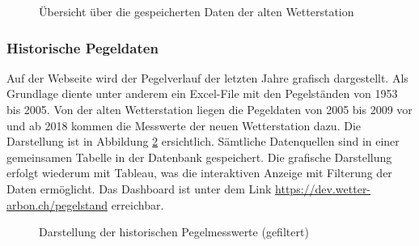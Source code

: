 \begin{figure}[h!]
	\centering
	\caption{Übersicht über die gespeicherten Daten der alten Wetterstation}
	\label{img:histAlt}
\end{figure}



\subsubsection{Historische Pegeldaten}
\label{subsec:pegelhistory}
Auf der Webseite wird der Pegelverlauf der letzten Jahre grafisch dargestellt. Als Grundlage diente unter anderem ein Excel-File mit den Pegelständen von 1953 bis 2005. Von der alten Wetterstation liegen die Pegeldaten von 2005 bis 2009 vor und ab 2018 kommen die Messwerte der neuen Wetterstation dazu. Die Darstellung ist in Abbildung \ref{img:histPegel} ersichtlich. Sämtliche Datenquellen sind in einer gemeinsamen Tabelle in der Datenbank gespeichert. Die grafische Darstellung erfolgt wiederum mit Tableau, was die interaktiven Anzeige mit Filterung der Daten ermöglicht. Das Dashboard ist unter dem Link \url{https://dev.wetter-arbon.ch/pegelstand} erreichbar.

\begin{figure}[h!]
	\centering
	\caption{Darstellung der historischen Pegelmesswerte (gefiltert)}
	\label{img:histPegel}
\end{figure}



